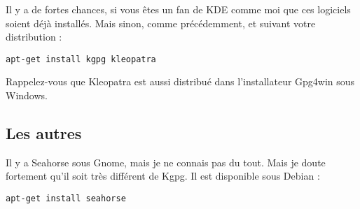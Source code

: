 Il y a de fortes chances, si vous êtes un fan de KDE comme moi que ces
logiciels soient déjà installés. Mais sinon, comme précédemment, et
suivant votre distribution :

\begin{verbatim}
apt-get install kgpg kleopatra
\end{verbatim}

Rappelez-vous que Kleopatra est aussi distribué dans l'installateur
Gpg4win sous Windows.

\subsection{Les autres}\label{les-autres-1}

Il y a Seahorse sous Gnome, mais je ne connais pas du tout. Mais je
doute fortement qu'il soit très différent de Kgpg. Il est disponible
sous Debian :

\begin{verbatim}
apt-get install seahorse
\end{verbatim}
